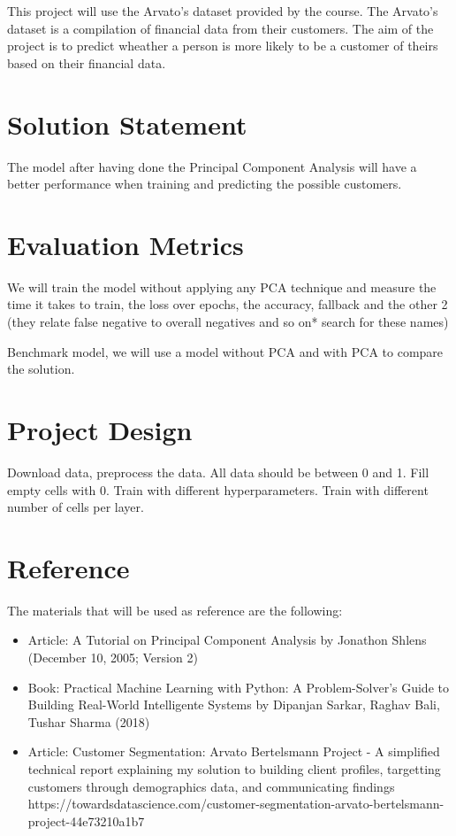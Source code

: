 This project will use the Arvato's dataset provided by the course. The
Arvato's dataset is a compilation of financial data from their
customers. The aim of the project is to predict wheather a person is
more likely to be a customer of theirs based on their financial data.

\hypertarget{solution-statement}{%
\section{Solution Statement}\label{solution-statement}}

The model after having done the Principal Component Analysis will have a
better performance when training and predicting the possible customers.

\hypertarget{evaluation-metrics}{%
\section{Evaluation Metrics}\label{evaluation-metrics}}

We will train the model without applying any PCA technique and measure
the time it takes to train, the loss over epochs, the accuracy, fallback
and the other 2 (they relate false negative to overall negatives and so
on* search for these names)

Benchmark model, we will use a model without PCA and with PCA to compare
the solution.

\hypertarget{project-design}{%
\section{Project Design}\label{project-design}}

Download data, preprocess the data. All data should be between 0 and 1.
Fill empty cells with 0. Train with different hyperparameters. Train
with different number of cells per layer.

\hypertarget{reference}{%
\section{Reference}\label{reference}}

The materials that will be used as reference are the following:

\begin{itemize}
\item
  Article: A Tutorial on Principal Component Analysis by Jonathon Shlens
  (December 10, 2005; Version 2)
\item
  Book: Practical Machine Learning with Python: A Problem-Solver's Guide
  to Building Real-World Intelligente Systems by Dipanjan Sarkar, Raghav
  Bali, Tushar Sharma (2018)
\item
  Article: Customer Segmentation: Arvato Bertelsmann Project - A
  simplified technical report explaining my solution to building client
  profiles, targetting customers through demographics data, and
  communicating findings
  https://towardsdatascience.com/customer-segmentation-arvato-bertelsmann-project-44e73210a1b7
\end{itemize}

